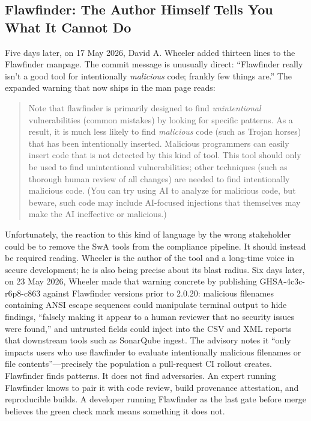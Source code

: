 \subsection*{Flawfinder: The Author Himself Tells You What It Cannot Do}

Five days later, on 17 May 2026, David A. Wheeler added thirteen lines to the Flawfinder manpage. The commit message is unusually direct: ``Flawfinder really isn't a good tool for intentionally \textit{malicious} code; frankly few things are.''\autocite{20260525:flawfinder} The expanded warning that now ships in the man page reads:

\begin{quote}
Note that flawfinder is primarily designed to find \textit{unintentional} vulnerabilities (common mistakes) by looking for specific patterns. As a result, it is much less likely to find \textit{malicious} code (such as Trojan horses) that has been intentionally inserted. Malicious programmers can easily insert code that is not detected by this kind of tool. This tool should only be used to find unintentional vulnerabilities; other techniques (such as thorough human review of all changes) are needed to find intentionally malicious code. (You can try using AI to analyze for malicious code, but beware, such code may include AI-focused injections that themselves may make the AI ineffective or malicious.)
\end{quote}

Unfortunately, the reaction to this kind of language by the wrong stakeholder could be to remove the SwA tools from the compliance pipeline. It should instead be required reading. Wheeler is the author of the tool and a long-time voice in secure development; he is also being precise about its blast radius. Six days later, on 23 May 2026, Wheeler made that warning concrete by publishing GHSA-4c3c-r6p8-c863 against Flawfinder versions prior to 2.0.20: malicious filenames containing ANSI escape sequences could manipulate terminal output to hide findings, ``falsely making it appear to a human reviewer that no security issues were found,'' and untrusted fields could inject into the CSV and XML reports that downstream tools such as SonarQube ingest.\autocite{20260525:flawfinderghsa} The advisory notes it ``only impacts users who use flawfinder to evaluate intentionally malicious filenames or file contents''---precisely the population a pull-request CI rollout creates. Flawfinder finds patterns. It does not find adversaries. An expert running Flawfinder knows to pair it with code review, build provenance attestation, and reproducible builds. A developer running Flawfinder as the last gate before merge believes the green check mark means something it does not.

